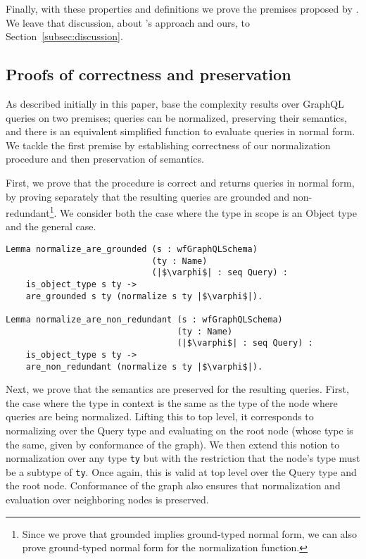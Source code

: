 Finally, with these properties and definitions we prove the premises proposed by \HP{}. We leave that discussion, about \HP{}'s approach and ours, to Section~\ref{subsec:discussion}.

\subsection{Proofs of correctness and preservation}

As described initially in this paper, \HP{} base the complexity results over GraphQL queries on two premises; queries can be normalized, preserving their semantics, and there is an equivalent simplified function to evaluate queries in normal form. We tackle the first premise by establishing correctness of our normalization procedure and then preservation of semantics.

First, we prove that the procedure is correct and returns queries in normal form, by proving separately that the resulting queries are grounded and non-redundant\footnote{Since we prove that grounded implies ground-typed normal form, we can also prove ground-typed normal form for the normalization function.}. We consider both the case where the type in scope is an Object type and the general case.

\begin{verbatim}
Lemma normalize_are_grounded (s : wfGraphQLSchema)
                             (ty : Name)
                             (|$\varphi$| : seq Query) :
    is_object_type s ty ->
    are_grounded s ty (normalize s ty |$\varphi$|).

Lemma normalize_are_non_redundant (s : wfGraphQLSchema)
                                  (ty : Name)
                                  (|$\varphi$| : seq Query) :
    is_object_type s ty ->
    are_non_redundant (normalize s ty |$\varphi$|).

\end{verbatim}

Next, we prove that the semantics are preserved for the resulting queries. First, the case where the type in context is the same as the type of the node where queries are being normalized. Lifting this to top level, it corresponds to normalizing over the Query type and evaluating on the root node (whose type is the same, given by conformance of the graph). We then extend this notion to normalization over any type \texttt{ty} but with the restriction that the node's type must be a subtype of \texttt{ty}. Once again, this is valid at top level over the Query type and the root node. Conformance of the graph also ensures that normalization and evaluation over neighboring nodes is preserved.

